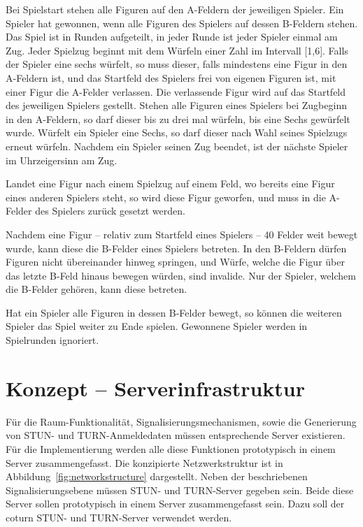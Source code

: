 Bei Spielstart stehen alle Figuren auf den A-Feldern der jeweiligen Spieler. Ein Spieler hat gewonnen, wenn alle Figuren des Spielers auf dessen B-Feldern stehen. Das Spiel ist in Runden aufgeteilt, in jeder Runde ist jeder Spieler einmal am Zug. Jeder Spielzug beginnt mit dem Würfeln einer Zahl im Intervall [1,6]. Falls der Spieler eine sechs würfelt, so muss dieser, falls mindestens eine Figur in den A-Feldern ist, und das Startfeld des Spielers frei von eigenen Figuren ist, mit einer Figur die A-Felder verlassen. Die verlassende Figur wird auf das Startfeld des jeweiligen Spielers gestellt. Stehen alle Figuren eines Spielers bei Zugbeginn in den A-Feldern, so darf dieser bis zu drei mal würfeln, bis eine Sechs gewürfelt wurde. Würfelt ein Spieler eine Sechs, so darf dieser nach Wahl seines Spielzugs erneut würfeln. Nachdem ein Spieler seinen Zug beendet, ist der nächste Spieler im Uhrzeigersinn am Zug.\par

Landet eine Figur nach einem Spielzug auf einem Feld, wo bereits eine Figur eines anderen Spielers steht, so wird diese Figur \glqq{}geworfen\grqq{}, und muss in die A-Felder des Spielers zurück gesetzt werden.\par

Nachdem eine Figur -- relativ zum Startfeld eines Spielers -- 40 Felder weit bewegt wurde, kann diese die B-Felder eines Spielers betreten. In den B-Feldern dürfen Figuren nicht übereinander hinweg springen, und Würfe, welche die Figur über das letzte B-Feld hinaus bewegen würden, sind invalide. Nur der Spieler, welchem die B-Felder gehören, kann diese betreten.\par

Hat ein Spieler alle Figuren in dessen B-Felder bewegt, so können die weiteren Spieler das Spiel weiter zu Ende spielen. Gewonnene Spieler werden in Spielrunden ignoriert.\par

\section{Konzept -- Serverinfrastruktur}
Für die Raum-Funktionalität, Signalisierungsmechanismen, sowie die Generierung von STUN- und TURN-Anmeldedaten müssen entsprechende Server existieren. Für die Implementierung werden alle diese Funktionen prototypisch in einem Server zusammengefasst. Die konzipierte Netzwerkstruktur ist in Abbildung~\ref{fig:networkstructure} dargestellt. Neben der beschriebenen Signalisierungsebene müssen \acs{STUN}- und \acs{TURN}-Server gegeben sein. Beide diese Server sollen prototypisch in einem Server zusammengefasst sein. Dazu soll der \glqq{}coturn\grqq{} STUN- und TURN-Server verwendet werden.

